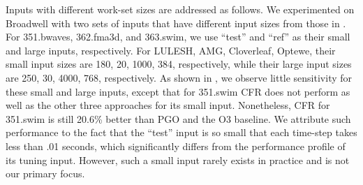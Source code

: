 Inputs with different work-set sizes are addressed as follows.  We
experimented on Broadwell with two sets of inputs that have different
input sizes from those in . For 351.bwaves, 362.fma3d,
and 363.swim, we use ``test'' and ``ref'' as their small and large
inputs, respectively. For LULESH, AMG, Cloverleaf, Optewe, their small
input sizes are 180, 20, 1000, 384, respectively, while their large
input sizes are 250, 30, 4000, 768, respectively.  As shown in
, we observe little sensitivity for these small
and large inputs, except that for 351.swim \toolname CFR does not
perform as well as the other three approaches for its small
input. Nonetheless, CFR for 351.swim is still 20.6\% better than PGO and the
O3 baseline.  We attribute such performance to the fact that the
``test'' input is so small that each time-step takes less than .01
seconds, which significantly differs from the performance profile of its
tuning input.
However, such a small input rarely exists in practice and is not our
primary focus.

